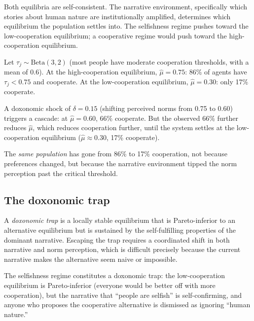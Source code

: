 Both equilibria are self-consistent.
The narrative environment, specifically which stories about human nature are institutionally amplified, determines which equilibrium the population settles into.
The selfishness regime pushes toward the low-cooperation equilibrium; a cooperative regime would push toward the high-cooperation equilibrium.

\begin{example}
\label{ex:self-fulfilling-numerical}
Let $\tau_j \sim \text{Beta}(3, 2)$ (most people have moderate cooperation thresholds, with a mean of 0.6).
At the high-cooperation equilibrium, $\hat{\mu} = 0.75$: 86\% of agents have $\tau_j < 0.75$ and cooperate.
At the low-cooperation equilibrium, $\hat{\mu} = 0.30$: only 17\% cooperate.

A doxonomic shock of $\delta = 0.15$ (shifting perceived norms from 0.75 to 0.60) triggers a cascade: at $\hat{\mu} = 0.60$, 66\% cooperate.
But the observed 66\% further reduces $\hat{\mu}$, which reduces cooperation further, until the system settles at the low-cooperation equilibrium ($\hat{\mu} \approx 0.30$, 17\% cooperate).

The \emph{same population} has gone from 86\% to 17\% cooperation, not because preferences changed, but because the narrative environment tipped the norm perception past the critical threshold.
\end{example}

\subsection{The doxonomic trap}

\begin{definition}
\label{def:doxonomic-trap}
A \emph{doxonomic trap} is a locally stable equilibrium that is Pareto-inferior to an alternative equilibrium but is sustained by the self-fulfilling properties of the dominant narrative.
Escaping the trap requires a coordinated shift in both narrative and norm perception, which is difficult precisely because the current narrative makes the alternative seem naive or impossible.
\end{definition}

The selfishness regime constitutes a doxonomic trap: the low-cooperation equilibrium is Pareto-inferior (everyone would be better off with more cooperation), but the narrative that ``people are selfish'' is self-confirming, and anyone who proposes the cooperative alternative is dismissed as ignoring ``human nature.''

